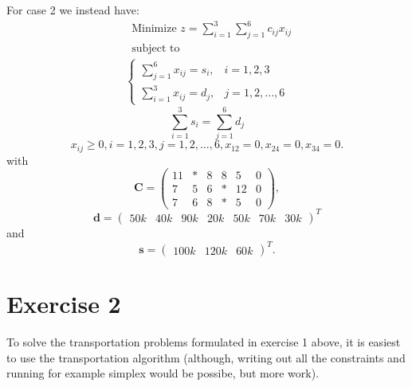 \documentclass{article}
\begin{document}
  \noindent
  For case 2 we instead have:
   \begin{align*}
  & \text{Minimize } z = \sum_{i=1}^{3}\sum_{j=1}^6 c_{ij}x_{ij} \\
  & \text{subject to}
    \label{eq17}
  \end{align*}
  \begin{align}
    \begin{cases}
      \sum_{j=1}^{6} x_{ij} = s_{i}, & i = 1, 2, 3 \\
      \sum_{i=1}^{3} x_{ij} = d_{j}, & j = 1, 2, ..., 6
    \end{cases}
  \end{align}
  \begin{equation}
    \sum_{i=1}^{3} s_{i} = \sum_{j=1}^6 d_{j}
    \label{eq19}
  \end{equation}
  \begin{equation}
    x_{ij} \geq 0, i = 1, 2, 3, j = 1, 2, ..., 6, x_{12} = 0, x_{24} = 0, x_{34} = 0.
    \label{eq20}
  \end{equation}
  with
  \begin{equation}
    \mathbf{C} = 
    \begin{pmatrix}
      11 & * & 8 & 8  & 5  & 0\\
      7  & 5 & 6 & *  & 12 & 0\\
      7  & 6 & 8 & *  & 5  & 0
    \end{pmatrix},
    \label{eq21}
  \end{equation}
  \begin{equation}
    \mathbf{d} =
    \begin{pmatrix}
      50k & 40k & 90k & 20k & 50k & 70k & 30k
    \end{pmatrix}^T
    \label{eq22}
  \end{equation}
  and
  \begin{equation}
    \mathbf{s} =
    \begin{pmatrix}
      100k & 120k & 60k
    \end{pmatrix}^T.
    \label{eq23}
  \end{equation}

  \section*{Exercise 2}
  To solve the transportation problems formulated in exercise 1 above, it is easiest to use the transportation algorithm (although, writing out all the constraints and running for example simplex would be possibe, but more work).
\end{document}
